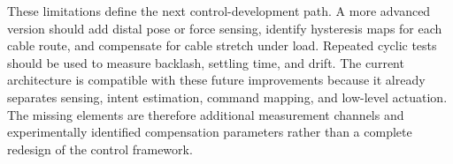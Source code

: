 These limitations define the next control-development path. A more advanced version should add distal pose or force sensing, identify hysteresis maps for each cable route, and compensate for cable stretch under load. Repeated cyclic tests should be used to measure backlash, settling time, and drift. The current architecture is compatible with these future improvements because it already separates sensing, intent estimation, command mapping, and low-level actuation. The missing elements are therefore additional measurement channels and experimentally identified compensation parameters rather than a complete redesign of the control framework.
